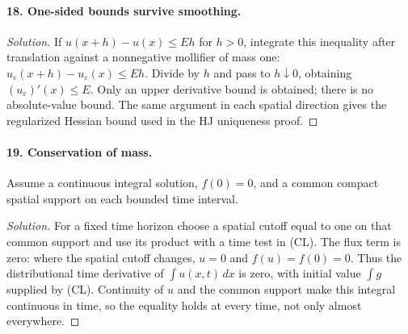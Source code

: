 \Needspace{30mm}
\paragraph{18. One-sided bounds survive smoothing.}
\begin{proof}[Solution]
If $u(x+h)-u(x)\leq Eh$ for $h>0$, integrate this inequality after
translation against a nonnegative mollifier of mass one:
$u_\varepsilon(x+h)-u_\varepsilon(x)\leq Eh$.
Divide by $h$ and pass to $h\downarrow0$, obtaining
$(u_\varepsilon)'(x)\leq E$.
Only an upper derivative bound is obtained; there is no absolute-value
bound. The same argument in each spatial direction gives the
regularized Hessian bound used in the HJ uniqueness proof.
\end{proof}

\Needspace{30mm}
\paragraph{19. Conservation of mass.}
Assume a continuous integral solution, $f(0)=0$, and a common compact
spatial support on each bounded time interval.
\begin{proof}[Solution]
For a fixed time horizon choose a spatial cutoff equal to one on that
common support and use its product with a time test in (CL).
The flux term is zero: where the spatial cutoff changes, $u=0$
and $f(u)=f(0)=0$.
Thus the distributional time derivative of $\int u(x,t)\,dx$ is zero,
with initial value $\int g$ supplied by (CL).
Continuity of $u$ and the common support make this integral continuous
in time, so the equality holds at every time, not only almost everywhere.
\end{proof}

\Needspace{30mm}
